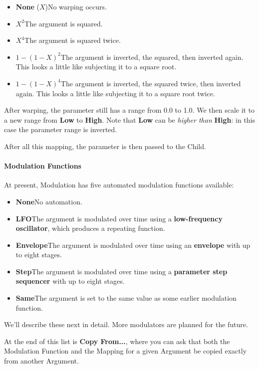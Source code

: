 \documentclass[twoside,10pt]{article}
\begin{document}
\begin{itemize}
\item {\bf None} (\(X\))\qquad No warping occurs.
\item \(X^2\)\qquad The argument is squared.
\item \(X^4\)\qquad The argument is squared twice.
\item \(1-(1-X)^2\)\qquad The argument is inverted, the squared, then inverted again.  This looks a little like subjecting it to a square root.
\item \(1-(1-X)^4\)\qquad The argument is inverted, the squared twice, then inverted again.  This looks a little like subjecting it to a square root twice.
\end{itemize}

After warping, the parameter still has a range from 0.0 to 1.0.  We then scale it to a new range from {\bf Low} to {\bf High}.  Note that {\bf Low} can be {\it higher than} {\bf High}: in this case the parameter range is inverted.

After all this mapping, the parameter is then passed to the Child.

\paragraph{Modulation Functions}

At present, Modulation has five automated modulation functions available:

\begin{itemize}
\item {\bf None}\qquad No automation.
\item {\bf LFO}\qquad The argument is modulated over time using a {\bf low-frequency oscillator}, which produces a repeating function.
\item {\bf Envelope}\qquad The argument is modulated over time using an {\bf envelope} with up to eight stages.
\item {\bf Step}\qquad The argument is modulated over time using a {\bf parameter step sequencer} with up to eight stages.
\item {\bf Same}\qquad The argument is set to the same value as some earlier modulation function.
\end{itemize}

We'll describe these next in detail.  More modulators are planned for the future.  

At the end of this list is {\bf Copy From...}, where you can ask that both the Modulation Function and the Mapping for a given Argument be copied exactly from another Argument.
\end{document}
